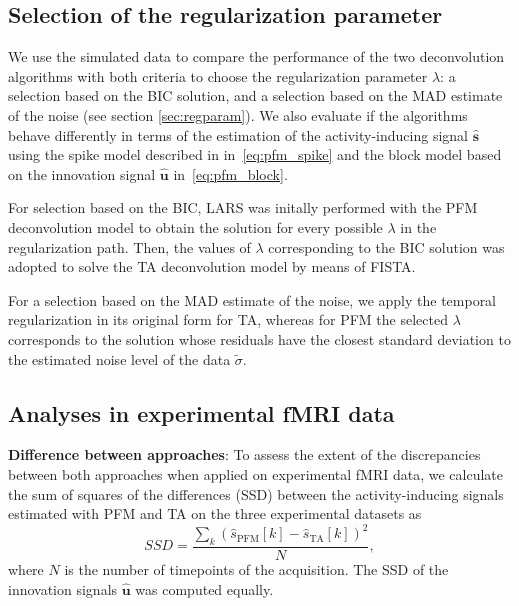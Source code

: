 \subsection{Selection of the regularization parameter}

We use the simulated data to compare the performance of the two deconvolution algorithms with both criteria to choose the regularization parameter $\lambda$: a selection based on the BIC solution, and a selection based on the MAD estimate of the noise (see section \ref{sec:regparam}). We also evaluate if the algorithms behave differently in terms of the estimation of the activity-inducing signal $\mathbf{\hat{s}}$ using the spike model described in in~\eqref{eq:pfm_spike} and the block model based on the innovation signal $\mathbf{\hat{u}}$ in~\eqref{eq:pfm_block}.

For selection based on the BIC, LARS was initally performed with the PFM deconvolution model to obtain the solution for every possible $\lambda$ in the regularization path. Then, the values of $\lambda$ corresponding to the BIC solution was adopted to solve the TA deconvolution model by means of FISTA. 

For a selection based on the MAD estimate of the noise, we apply the temporal regularization in its original form for TA, whereas for PFM the selected $\lambda$ corresponds to the solution whose residuals have the closest standard deviation to the estimated noise level of the data $\tilde{\sigma}$.  %

\subsection{Analyses in experimental fMRI data}

\textbf{Difference between approaches}: To assess the extent of the discrepancies between both approaches when applied on experimental fMRI data, we calculate the sum of squares of the differences (SSD) between the activity-inducing signals estimated with PFM and TA on the three experimental datasets as
\begin{equation}
    SSD = \frac{\sum_{k}{(\hat{s}_\text{PFM}[k] - \hat{s}_\text{TA}[k])^2}}{N},
\end{equation}
where $N$ is the number of timepoints of the acquisition. The SSD of the innovation signals $\mathbf{\hat{u}}$ was computed equally.

